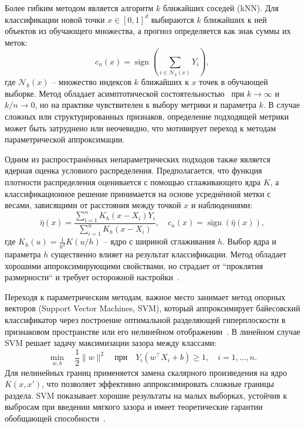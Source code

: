 Более гибким методом является алгоритм \(k\) ближайших соседей (kNN). Для классификации новой точки \(x \in [0,1]^d\) выбираются \(k\) ближайших к ней объектов из обучающего множества, а прогноз определяется как знак суммы их меток:
\[
c_n(x) = \operatorname{sign}\left( \sum_{i \in \mathcal{N}_k(x)} Y_i \right),
\]
где \(\mathcal{N}_k(x)\) -- множество индексов \(k\) ближайших к \(x\) точек в обучающей выборке. Метод обладает асимптотической состоятельностью~\cite{devroye1996consistency} при \(k \to \infty\) и \(k/n \to 0\), но на практике чувствителен к выбору метрики и параметра \(k\). В случае сложных или структурированных признаков, определение подходящей метрики может быть затруднено или неочевидно, что мотивирует переход к методам параметрической аппроксимации.


Одним из распространённых непараметрических подходов также является ядерная оценка условного распределения. Предполагается, что функция плотности распределения оценивается с помощью сглаживающего ядра \(K\), а классификационное решение принимается на основе усреднённой метки с весами, зависящими от расстояния между точкой \(x\) и наблюдениями:
\[
\hat{\eta}(x) = \frac{\sum_{i=1}^n K_h(x - X_i) Y_i}{\sum_{i=1}^n K_h(x - X_i)},
\quad
c_n(x) = \operatorname{sign}(\hat{\eta}(x)),
\]
где \(K_h(u) = \frac{1}{h^d} K(u/h)\) -- ядро с шириной сглаживания \(h\). Выбор ядра и параметра \(h\) существенно влияет на результат классификации. Метод обладает хорошими аппроксимирующими свойствами, но страдает от ``проклятия размерности`` и требует осторожной настройки~\cite{wand1994kernel, gyorfi2002distribution}.

Переходя к параметрическим методам, важное место занимает метод опорных векторов (Support Vector Machines, SVM), который аппроксимирует байесовский классификатор через построение оптимальной разделяющей гиперплоскости в признаковом пространстве или его нелинейном отображении~\cite{cortes1995support}. В линейном случае SVM решает задачу максимизации зазора между классами:
\[
\min_{w, b} \quad \frac{1}{2} \|w\|^2
\quad \text{при} \quad
Y_i(w^\top X_i + b) \geq 1, \quad i = 1, \dots, n.
\]
Для нелинейных границ применяется замена скалярного произведения на ядро \(K(x, x')\), что позволяет эффективно аппроксимировать сложные границы раздела. SVM показывает хорошие результаты на малых выборках, устойчив к выбросам при введении мягкого зазора и имеет теоретические гарантии обобщающей способности~\cite{steinwart2008support}.

